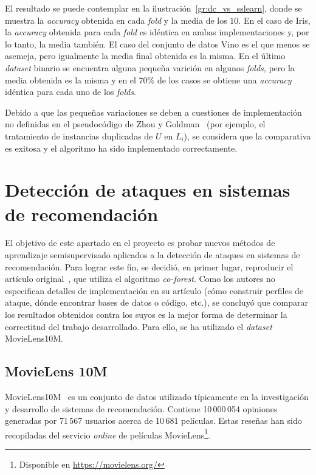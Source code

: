 El resultado se puede contemplar en la ilustración~\ref{gr:dc_vs_sslearn}, donde se muestra la \textit{accuracy} obtenida en cada \textit{fold} y la media de los $10$. En el caso de Iris, la \textit{accuracy} obtenida para cada \textit{fold} es idéntica en ambas implementaciones y, por lo tanto, la media también. El caso del conjunto de datos Vino es el que menos se asemeja, pero igualmente la media final obtenida es la misma. En el último \textit{dataset} binario se encuentra alguna pequeña varición en algunos \textit{folds}, pero la media obtenida es la misma y en el 70\% de los casos se obtiene una \textit{accuracy} idéntica para cada uno de los \textit{folds}.

Debido a que las pequeñas variaciones se deben a cuestiones de implementación no definidas en el pseudocódigo de Zhou y Goldman~\cite{democraticCoLearning2004original} (por ejemplo, el tratamiento de instancias duplicadas de $U$ en $L_i$), se considera que la comparativa es exitosa y el algoritmo ha sido implementado correctamente.


\section{Detección de ataques en sistemas de recomendación}
\label{sec:5_detec_ataques}
El objetivo de este apartado en el proyecto es probar nuevos métodos de aprendizaje semisupervisado aplicados a la detección de ataques en sistemas de recomendación. Para lograr este fin, se decidió, en primer lugar, reproducir el artículo original~\cite{zhou2021SemisupervisedRecommendationAttack}, que utiliza el algoritmo \textit{co-forest}. Como los autores no especifican detalles de implementación en su artículo (cómo construir perfiles de ataque, dónde encontrar bases de datos o código, etc.), se concluyó que comparar los resultados obtenidos contra los suyos es la mejor forma de determinar la correctitud del trabajo desarrollado. Para ello, se ha utilizado el \textit{dataset} MovieLens10M.

\subsection{MovieLens 10M}

MovieLens10M~\cite{groupLensDatasets} es un conjunto de datos utilizado típicamente en la investigación y desarrollo de sistemas de recomendación. Contiene 10\,000\,054 opiniones generadas por 71\,567 usuarios acerca de 10\,681 películas. Estas reseñas han sido recopiladas del servicio \textit{online} de películas MovieLens\footnote{ Disponible en {\url{https://movielens.org/}}}.

